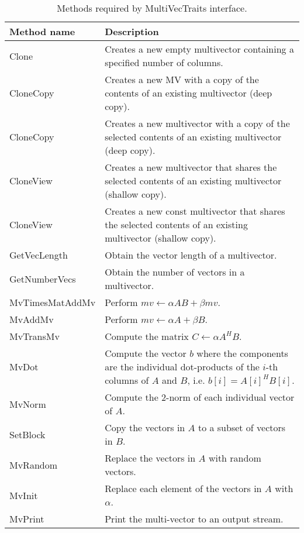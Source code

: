 \begin{table}
\begin{center}
\begin{tabular}{| p{4cm} || p{8cm} |}
\hline
Method name & Description \\
\hline\hline
Clone           & Creates a new empty multivector containing a specified number
of columns.  \\\hline
CloneCopy       & Creates a new MV with a copy of the contents of an existing
multivector (deep copy). \\\hline
CloneCopy       & Creates a new multivector with a copy of the selected contents of
an existing multivector (deep copy).  \\\hline
CloneView       & Creates a new multivector that shares the selected contents of
an existing multivector (shallow copy).  \\\hline
CloneView       & Creates a new const multivector that shares the selected
contents of an existing multivector (shallow copy).  \\\hline
GetVecLength    & Obtain the vector length of a multivector.  \\\hline
GetNumberVecs   & Obtain the number of vectors in a multivector.  \\\hline
MvTimesMatAddMv & Perform $mv \leftarrow \alpha AB + \beta mv$.  \\\hline
MvAddMv         & Perform $mv \leftarrow \alpha A + \beta B$.  \\\hline
MvTransMv       & Compute the matrix $C \leftarrow \alpha A^H B$.  \\\hline
MvDot           & Compute the vector $b$ where the components are the individual
dot-products of the $i$-th columns of $A$ and $B$, i.e. $b[i] = A[i]^H B[i]$.
\\\hline
MvNorm          & Compute the 2-norm of each individual vector of $A$.  \\\hline
SetBlock        & Copy the vectors in $A$ to a subset of vectors in $B$. \\\hline
MvRandom        & Replace the vectors in $A$ with random vectors.  \\\hline
MvInit          & Replace each element of the vectors in $A$ with $\alpha$.  \\\hline
MvPrint         & Print the multi-vector to an output stream.  \\\hline
\hline
\end{tabular}
\caption{Methods required by MultiVecTraits interface.}
\label{tab:anasazi:mvt}
\end{center}
\end{table}

